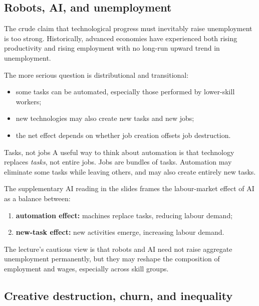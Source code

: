 \documentclass[12pt]{article}
\begin{document}
\subsection{Robots, AI, and unemployment}

The crude claim that technological progress must inevitably raise unemployment is too strong. Historically, advanced economies have experienced both rising productivity and rising employment with no long-run upward trend in unemployment.

The more serious question is distributional and transitional:
\begin{itemize}[leftmargin=1.5em]
\item some tasks can be automated, especially those performed by lower-skill workers;
\item new technologies may also create new tasks and new jobs;
\item the net effect depends on whether job creation offsets job destruction.
\end{itemize}

\begin{definition}{Tasks, not jobs}{}
A useful way to think about automation is that technology replaces \emph{tasks}, not entire jobs. Jobs are bundles of tasks. Automation may eliminate some tasks while leaving others, and may also create entirely new tasks.
\end{definition}

The supplementary AI reading in the slides frames the labour-market effect of AI as a balance between:
\begin{enumerate}[leftmargin=1.5em]
\item \textbf{automation effect:} machines replace tasks, reducing labour demand;
\item \textbf{new-task effect:} new activities emerge, increasing labour demand.
\end{enumerate}

\begin{policynote}
The lecture's cautious view is that robots and AI need not raise aggregate unemployment permanently, but they may reshape the composition of employment and wages, especially across skill groups.
\end{policynote}

\subsection{Creative destruction, churn, and inequality}
\end{document}
